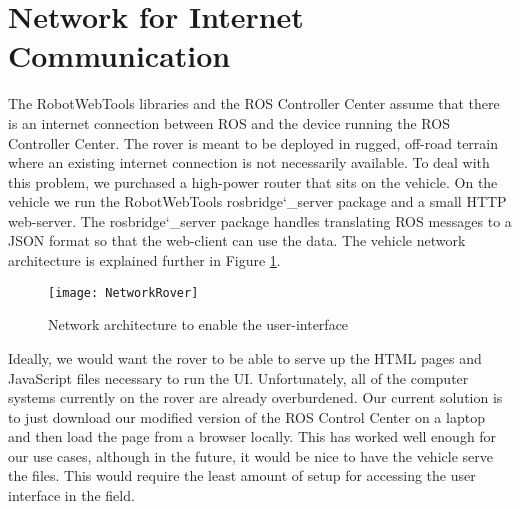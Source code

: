 \section{Network for Internet Communication}The RobotWebTools libraries and the ROS Controller Center assume that there is an internet connection between ROS and the device running the ROS Controller Center.  The rover is meant to be deployed in rugged, off-road terrain where an existing internet connection is not necessarily available.  To deal with this problem, we purchased a high-power router that sits on the vehicle.  On the vehicle we run the RobotWebTools rosbridge\char`_server package and a small HTTP web-server.  The rosbridge\char`_server package handles translating ROS messages to a JSON format so that the web-client can use the data. The vehicle network architecture is explained further in Figure \ref{fig:NetworkRover}.

\begin{figure}[H]
\centerline{\texttt{[image: NetworkRover]}}
\caption[]{Network architecture to enable the user-interface}
\label{fig:NetworkRover}
\end{figure}

Ideally, we would want the rover to be able to serve up the HTML pages and JavaScript files necessary to run the UI.  Unfortunately, all of the computer systems currently on the rover are already overburdened.  Our current solution is to just download our modified version of the ROS Control Center on a laptop and then load the page from a browser locally.  This has worked well enough for our use cases, although in the future, it would be nice to have the vehicle serve the files.  This would require the least amount of setup for accessing the user interface in the field.